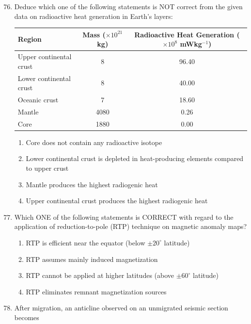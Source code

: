 \documentclass[journal,12pt,onecolumn]{IEEEtran}
\theoremstyle{remark}
\begin{document}
\begin{enumerate}
\setcounter{enumi}{75}

\item Deduce which one of the following statements is NOT correct from the given data on radioactive heat generation in Earth's layers:
\begin{table}[ht]
\centering
\begin{tabular}{|l|c|c|}
\hline
\textbf{Region} & \textbf{Mass ($\times 10^{21}$ kg)} & \textbf{Radioactive Heat Generation ($\times 10^8$ mWkg$^{-1}$)} \\
\hline
Upper continental crust & 8 & 96.40 \\
\hline
Lower continental crust & 8 & 40.00 \\
\hline
Oceanic crust & 7 & 18.60 \\
\hline
Mantle & 4080 & 0.26 \\
\hline
Core & 1880 & 0.00 \\
\hline
\end{tabular}
\end{table}


\begin{enumerate}
\item Core does not contain any radioactive isotope  
\item Lower continental crust is depleted in heat-producing elements compared to upper crust  
\item Mantle produces the highest radiogenic heat  
\item Upper continental crust produces the highest radiogenic heat  
\end{enumerate}

\item Which ONE of the following statements is CORRECT with regard to the application of reduction-to-pole (RTP) technique on magnetic anomaly maps?

\begin{enumerate}
\item RTP is efficient near the equator (below $\pm 20^\circ$ latitude)  
\item RTP assumes mainly induced magnetization  
\item RTP cannot be applied at higher latitudes (above $\pm 60^\circ$ latitude)  
\item RTP eliminates remnant magnetization sources  
\end{enumerate}

\item After migration, an anticline observed on an unmigrated seismic section becomes


\end{enumerate}
\end{document}
